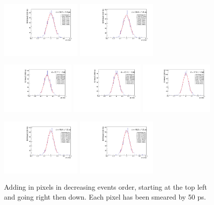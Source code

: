 \documentclass[twocolumn,aps,prd,reprint,superscriptaddress,floatfix]{revtex4-1}
\begin{document}
\begin{figure}[!htbp]
\centering
	\includegraphics[width=0.35\textwidth]{SKIROC_1_Pixels50.pdf}
	\includegraphics[width=0.35\textwidth]{SKIROC_2_Pixels50.pdf}
	
	\includegraphics[width=0.32\textwidth]{SKIROC_3_Pixels50.pdf}
	\includegraphics[width=0.32\textwidth]{SKIROC_4_Pixels50.pdf}
	\includegraphics[width=0.32\textwidth]{SKIROC_5_Pixels50.pdf}
	
	\includegraphics[width=0.35\textwidth]{SKIROC_6_Pixels50.pdf}
	\includegraphics[width=0.35\textwidth]{SKIROC_7_Pixels50.pdf}
	\caption{Adding in pixels in decreasing events order, starting at the top left and going right then down.
		Each pixel has been smeared by 50 ps.}
	\label{fig:50psAll}
\end{figure}
\end{document}
